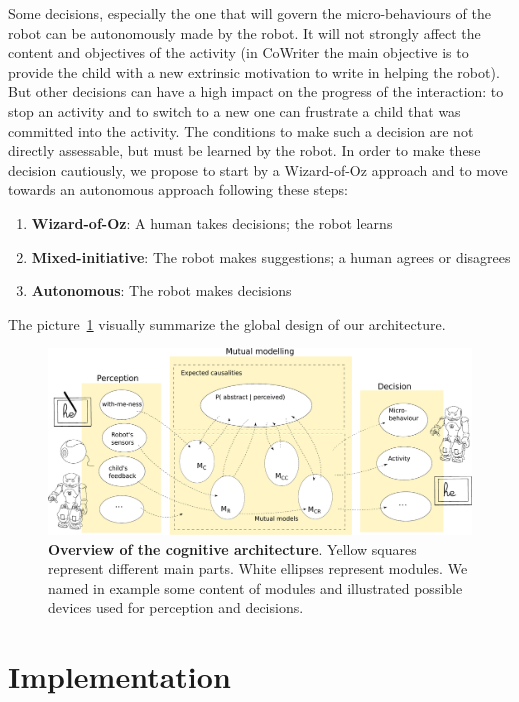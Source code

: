 \documentclass[10pt,a4paper]{article}
\begin{document}
Some decisions, especially the one that will govern the micro-behaviours of the robot can be autonomously made by the robot. It will not strongly affect the content and objectives of the activity (in CoWriter the main objective is to provide the child with a new extrinsic motivation to write in helping the robot). But other decisions can have a high impact on the progress of the interaction: to stop an activity and to switch to a new one can frustrate a child that was committed into the activity. The conditions to make such a decision are not directly assessable, but must be learned by the robot. In order to make these decision cautiously, we propose to start by a Wizard-of-Oz approach and to move towards an autonomous approach following these steps: 
\begin{enumerate}
\item \textbf{Wizard-of-Oz}: A human takes decisions; the robot learns
\item \textbf{Mixed-initiative}: The robot makes suggestions; a human agrees or disagrees
\item \textbf{Autonomous}: The robot makes decisions
\end{enumerate}

The picture~\ref{cog} visually summarize the global design of our architecture. 

\begin{figure}[!]
\centering
\includegraphics[width=1\columnwidth]{cognitive_archi}
\caption{\small\textbf{Overview of the cognitive architecture}. Yellow squares represent different main parts. White ellipses represent modules. We named in example some content of modules and illustrated possible devices used for perception and decisions. }
\label{cog}
\end{figure}

\section{Implementation}
\end{document}
